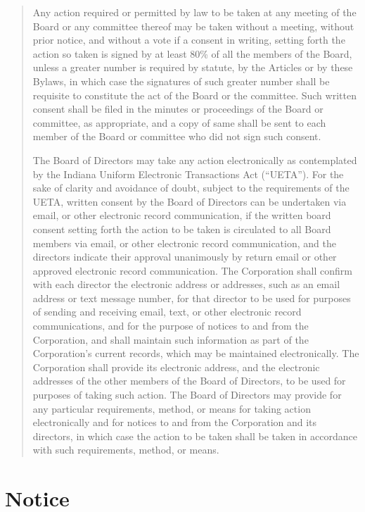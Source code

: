 \documentclass[
]{book}
\begin{document}
\begin{quote}
Any action required or permitted by law to be taken at any meeting of
the Board or any committee thereof may be taken without a meeting,
without prior notice, and without a vote if a consent in writing,
setting forth the action so taken is signed by at least 80\% of all the
members of the Board, unless a greater number is required by statute,
by the Articles or by these Bylaws, in which case the signatures of
such greater number shall be requisite to constitute the act of the
Board or the committee. Such written consent shall be filed in the
minutes or proceedings of the Board or committee, as appropriate, and
a copy of same shall be sent to each member of the Board or committee
who did not sign such consent.

The Board of Directors may take any action electronically as
contemplated by the Indiana Uniform Electronic Transactions Act
(``UETA''). For the sake of clarity and avoidance of doubt, subject to
the requirements of the UETA, written consent by the Board of
Directors can be undertaken via email, or other electronic record
communication, if the written board consent setting forth the action
to be taken is circulated to all Board members via email, or other
electronic record communication, and the directors indicate their
approval unanimously by return email or other approved electronic
record communication. The Corporation shall confirm with each director
the electronic address or addresses, such as an email address or text
message number, for that director to be used for purposes of sending
and receiving email, text, or other electronic record communications,
and for the purpose of notices to and from the Corporation, and shall
maintain such information as part of the Corporation's current
records, which may be maintained electronically. The Corporation shall
provide its electronic address, and the electronic addresses of the
other members of the Board of Directors, to be used for purposes of
taking such action. The Board of Directors may provide for any
particular requirements, method, or means for taking action
electronically and for notices to and from the Corporation and its
directors, in which case the action to be taken shall be taken in
accordance with such requirements, method, or means.
\end{quote}

\section{Notice}\label{notice}
\end{document}
